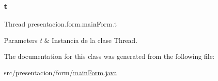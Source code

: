 \subsubsection{\texorpdfstring{t}{t}}
{\footnotesize\ttfamily Thread presentacion.\+form.\+main\+Form.\+t\hspace{0.3cm}{\ttfamily [private]}}


\begin{DoxyParams}{Parameters}
{\em t} & Instancia de la clase Thread. \\
\hline
\end{DoxyParams}


The documentation for this class was generated from the following file\+:\begin{DoxyCompactItemize}
\item 
src/presentacion/form/\hyperlink{mainForm_8java}{main\+Form.\+java}\end{DoxyCompactItemize}
